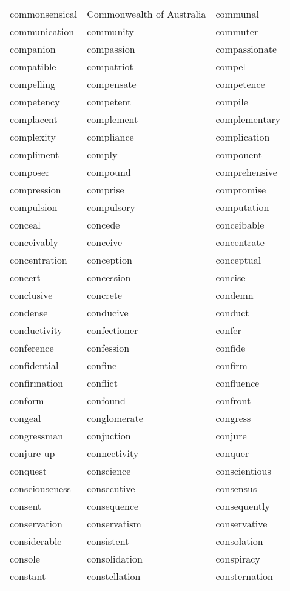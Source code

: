 \documentclass{minimal}
\begin{document}
\begin{longtable}{p{2.8cm}p{2.8cm}p{2.8cm}}
commonsensical & Commonwealth of Australia & communal \\
communication & community & commuter \\
companion & compassion & compassionate \\
compatible & compatriot & compel \\
compelling & compensate & competence \\
competency & competent & compile \\
complacent & complement & complementary \\
complexity & compliance & complication \\
compliment & comply & component \\
composer & compound & comprehensive \\
compression & comprise & compromise \\
compulsion & compulsory & computation \\
conceal & concede & conceibable \\
conceivably & conceive & concentrate \\
concentration & conception & conceptual \\
concert & concession & concise \\
conclusive & concrete & condemn \\
condense & conducive & conduct \\
conductivity & confectioner & confer \\
conference & confession & confide \\
confidential & confine & confirm \\
confirmation & conflict & confluence \\
conform & confound & confront \\
congeal & conglomerate & congress \\
congressman & conjuction & conjure \\
conjure up & connectivity & conquer \\
conquest & conscience & conscientious \\
consciouseness & consecutive & consensus \\
consent & consequence & consequently \\
conservation & conservatism & conservative \\
considerable & consistent & consolation \\
console & consolidation & conspiracy \\
constant & constellation & consternation \\

\end{longtable}
\end{document}
